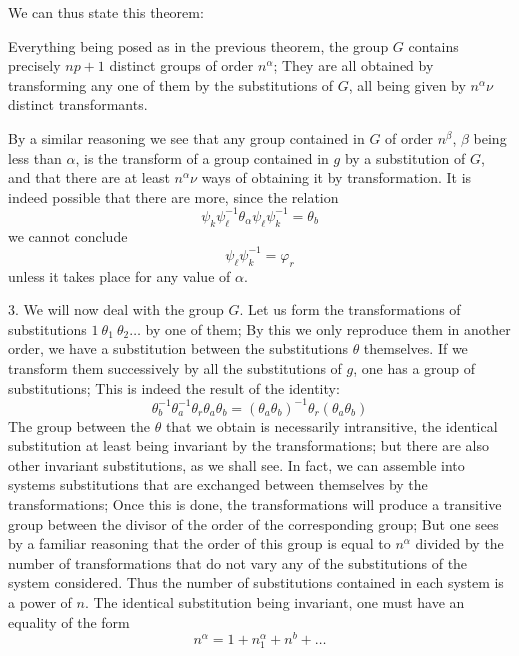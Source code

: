 \documentclass[11pt,fancy]{elegantbook}
\begin{document}
We can thus state this theorem:
\begin{theorem}
Everything being posed as in the previous theorem, the group $G$ contains precisely $np +1$ distinct groups of order $n^\alpha$; They are all obtained by transforming any one of them by the substitutions of $G$, all being given by $n^\alpha{\nu}$ distinct transformants.
\end{theorem}

By a similar reasoning we see that any group contained in $G$ of order $n^\beta$, $\beta$ being less than $\alpha$, is the transform of a group contained in $g$ by a substitution of $G$, and that there are at least $n^\alpha{\nu}$ ways of obtaining it by transformation. It is indeed possible that there are more, since the relation
\begin{equation}
    \psi_k\psi_\ell^{-1}\theta_\alpha\psi_\ell\psi_k^{-1} = \theta_b
\end{equation}
we cannot conclude
\begin{equation}
    \psi_\ell{\psi_k^{-1}}=\varphi_r
\end{equation}
unless it takes place for any value of $\alpha$.

3. We will now deal with the group $G$. Let us form the transformations of substitutions $1 \ \theta_1 \ \theta_2 \dots$ by one of them; By this we only reproduce them in another order, we have a substitution between the substitutions $\theta$ themselves. If we transform them successively by all the substitutions of $g$, one has a group of substitutions; This is indeed the result of the identity: 
\begin{equation}
    \theta_b^{-1}\theta_a^{-1}\theta_r\theta_a\theta_b=(\theta_a\theta_b)^{-1}\theta_r(\theta_a\theta_b)
\end{equation}
The group between the $\theta$ that we obtain is necessarily intransitive, the identical substitution at least being invariant by the transformations; but there are also other invariant substitutions, as we shall see. In fact, we can assemble into systems substitutions that are exchanged between themselves by the transformations; Once this is done, the transformations will produce a transitive group between the divisor of the order of the corresponding group; But one sees by a familiar reasoning that the order of this  group is equal to $n^\alpha$ divided by the number of transformations that do not vary any of the substitutions of the system considered. Thus the number of substitutions contained in each system is a power of $n$. The identical substitution being invariant, one must have an equality of the form
\begin{equation}
    n^\alpha=1 + n_1^\alpha + n^b + \dots
\end{equation}
\end{document}
